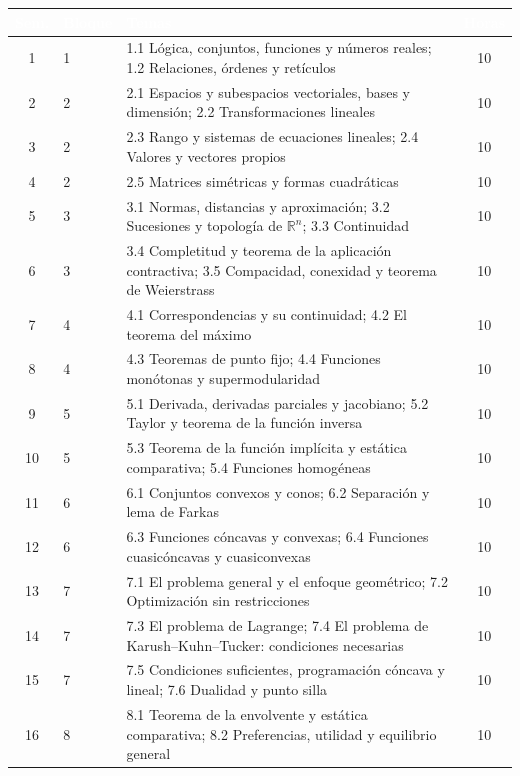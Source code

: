 \documentclass[11pt,a4paper]{article}
\renewcommand{\arraystretch}{1.3}
\newcommand{\cab}[1]{\textcolor{white}{\sffamily\bfseries #1}}
\newcommand{\filasalternas}{\rowcolors{2}{white}{tonoPalido}}
\begin{document}
{\small\filasalternas
\renewcommand{\arraystretch}{1.1}\noindent\begin{tabularx}{\textwidth}{clXc}
\toprule
\rowcolor{tonoOscuro}\cab{Sem.} & \cab{Bloque} & \cab{Temas} & \cab{Horas} \\
\midrule
1  & 1 & 1.1 Lógica, conjuntos, funciones y números reales; 1.2 Relaciones, órdenes y retículos & 10 \\
\midrule
2  & 2 & 2.1 Espacios y subespacios vectoriales, bases y dimensión; 2.2 Transformaciones lineales & 10 \\
3  & 2 & 2.3 Rango y sistemas de ecuaciones lineales; 2.4 Valores y vectores propios & 10 \\
4  & 2 & 2.5 Matrices simétricas y formas cuadráticas & 10 \\
\midrule
5  & 3 & 3.1 Normas, distancias y aproximación; 3.2 Sucesiones y topología de $\mathbb{R}^n$; 3.3 Continuidad & 10 \\
6  & 3 & 3.4 Completitud y teorema de la aplicación contractiva; 3.5 Compacidad, conexidad y teorema de Weierstrass & 10 \\
\midrule
7  & 4 & 4.1 Correspondencias y su continuidad; 4.2 El teorema del máximo & 10 \\
8  & 4 & 4.3 Teoremas de punto fijo; 4.4 Funciones monótonas y supermodularidad & 10 \\
\midrule
9  & 5 & 5.1 Derivada, derivadas parciales y jacobiano; 5.2 Taylor y teorema de la función inversa & 10 \\
10 & 5 & 5.3 Teorema de la función implícita y estática comparativa; 5.4 Funciones homogéneas & 10 \\
\midrule
11 & 6 & 6.1 Conjuntos convexos y conos; 6.2 Separación y lema de Farkas & 10 \\
12 & 6 & 6.3 Funciones cóncavas y convexas; 6.4 Funciones cuasicóncavas y cuasiconvexas & 10 \\
\midrule
13 & 7 & 7.1 El problema general y el enfoque geométrico; 7.2 Optimización sin restricciones & 10 \\
14 & 7 & 7.3 El problema de Lagrange; 7.4 El problema de Karush--Kuhn--Tucker: condiciones necesarias & 10 \\
15 & 7 & 7.5 Condiciones suficientes, programación cóncava y lineal; 7.6 Dualidad y punto silla & 10 \\
\midrule
16 & 8 & 8.1 Teorema de la envolvente y estática comparativa; 8.2 Preferencias, utilidad y equilibrio general & 10 \\
\bottomrule
\end{tabularx}

}
\end{document}

